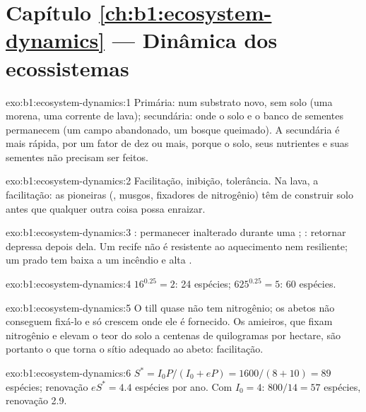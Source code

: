 \section*{Capítulo \ref{ch:b1:ecosystem-dynamics} --- Dinâmica dos ecossistemas}

\begin{solution}{exo:b1:ecosystem-dynamics:1}
Primária: num substrato novo, sem solo (uma morena, uma corrente de
lava); secundária: onde o solo e o banco de sementes permanecem (um
campo abandonado, um bosque queimado). A secundária é mais rápida, por
um fator de dez ou mais, porque o solo, seus nutrientes e suas
sementes não precisam ser feitos.
\end{solution}

\begin{solution}{exo:b1:ecosystem-dynamics:2}
Facilitação, inibição, tolerância. Na lava, a facilitação: as
pioneiras (, musgos, fixadores de nitrogênio) têm de construir
solo antes que qualquer outra coisa possa enraizar.
\end{solution}

\begin{solution}{exo:b1:ecosystem-dynamics:3}
: permanecer inalterado durante uma ;
: retornar depressa depois dela. Um recife não é resistente
ao aquecimento nem resiliente; um prado tem baixa  a um
incêndio e alta .
\end{solution}

\begin{solution}{exo:b1:ecosystem-dynamics:4}
$16^{0.25} = 2$: \num{24} espécies; $625^{0.25} = 5$: \num{60} espécies.
\end{solution}

\begin{solution}{exo:b1:ecosystem-dynamics:5}
O till quase não tem nitrogênio; os abetos não conseguem fixá-lo e só
crescem onde ele é fornecido. Os amieiros, que fixam nitrogênio e
elevam o teor do solo a centenas de quilogramas por hectare, são
portanto o que torna o sítio adequado ao abeto: facilitação.
\end{solution}

\begin{solution}{exo:b1:ecosystem-dynamics:6}
$S^* = I_0 P/(I_0 + eP) = 1600/(8 + 10) = 89$ espécies; renovação
$eS^* = 4.4$ espécies por ano. Com $I_0 = 4$: $800/14 = 57$ espécies,
renovação \num{2.9}.
\end{solution}

